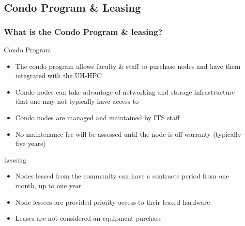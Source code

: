 \subsection{Condo Program \& Leasing}
\begin{frame}
  \frametitle{What is the Condo Program \& leasing?}
	\begin{block}{Condo Program}\scriptsize
		\begin{itemize}
		\item The condo program allows faculty \& staff to purchase nodes and have them integrated with the UH-HPC
		\item Condo nodes can take advantage of networking and storage infrastructure that one may not typically have access to
		\item Condo nodes are managed and maintained by ITS staff
		\item No maintenance fee will be assessed until the node is off warranty (typically five years)
		\end{itemize}
	\end{block}
	\begin{block}{Leasing}\scriptsize
		\begin{itemize}
		\item Nodes leased from the community can have a contracts period from one month, up to one year
		\item Node lessees are provided priority access to their leased hardware
		\item Leases are not considered an equipment purchase
		\end{itemize}
	\end{block}
\end{frame}

